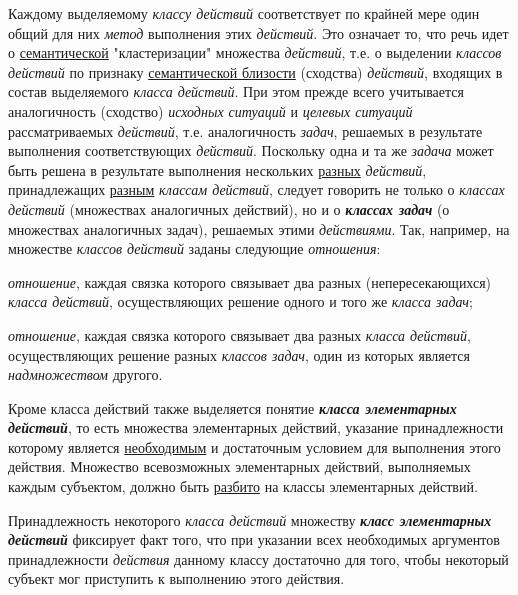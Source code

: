 \begin{SCn}
\end{SCn}

Каждому выделяемому \textit{классу действий} соответствует по крайней мере один общий для них \textit{метод} выполнения этих \textit{действий}. Это означает то, что речь идет о \underline{семантической} "кластеризации"{} множества \textit{действий}, т.е. о выделении \textit{классов действий} по признаку \underline{семантической близости} (сходства) \textit{действий}, входящих в состав выделяемого \textit{класса действий}. При этом прежде всего учитывается аналогичность (сходство) \textit{исходных ситуаций} и \textit{целевых ситуаций} рассматриваемых \textit{действий}, т.е. аналогичность \textit{задач}, решаемых в результате выполнения соответствующих \textit{действий}. Поскольку одна и та же \textit{задача} может быть решена в результате выполнения нескольких \underline{разных} \textit{действий}, принадлежащих \underline{разным} \textit{классам действий}, следует говорить не только о \textit{классах действий} (множествах аналогичных действий), но и о \textbf{\textit{классах задач}} (о множествах аналогичных задач), решаемых этими \textit{действиями}. Так, например, на множестве \textit{классов действий} заданы следующие \textit{отношения}:
\begin{textitemize}
	\item \textit{отношение}, каждая связка которого связывает два разных (непересекающихся) \textit{класса действий}, осуществляющих решение одного и того же \textit{класса задач};
	\item \textit{отношение}, каждая связка которого связывает два разных \textit{класса действий}, осуществляющих решение разных \textit{классов задач}, один из которых является \textit{надмножеством} другого.
\end{textitemize}

Кроме класса действий также выделяется понятие \textbf{\textit{класса элементарных действий}}, то есть множества элементарных действий, указание принадлежности которому является \underline{необходимым} и достаточным условием для выполнения этого действия. Множество всевозможных элементарных действий, выполняемых каждым субъектом, должно быть \underline{разбито} на классы элементарных действий.

Принадлежность некоторого \textit{класса действий} множеству \textbf{\textit{класс элементарных действий}} фиксирует факт того, что при указании всех необходимых аргументов принадлежности \textit{действия} данному классу достаточно для того, чтобы некоторый субъект мог приступить к выполнению этого действия.

